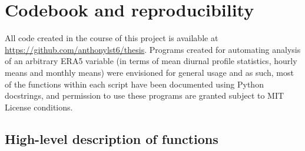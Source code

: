 \chapter{Codebook and reproducibility}
\label{app:code}

All code created in the course of this project is available at \url{https://github.com/anthonylst6/thesis}. Programs created for automating analysis of an arbitrary \ac{ERA5} variable (in terms of mean diurnal profile statistics, hourly means and monthly means) were envisioned for general usage and as such, most of the functions within each script have been documented using Python docstrings, and permission to use these programs are granted subject to MIT License conditions.

\section{High-level description of functions}

